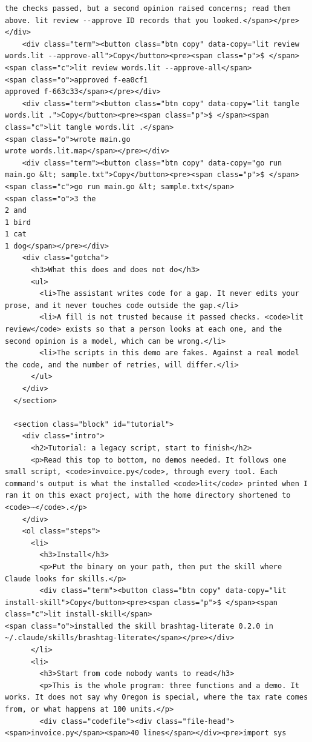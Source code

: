 \documentclass[10pt,a4paper]{article}
\begin{document}
\begin{Verbatim}
the checks passed, but a second opinion raised concerns; read them above. lit review --approve ID records that you looked.</span></pre></div>
    <div class="term"><button class="btn copy" data-copy="lit review words.lit --approve-all">Copy</button><pre><span class="p">$ </span><span class="c">lit review words.lit --approve-all</span>
<span class="o">approved f-ea0cf1
approved f-663c33</span></pre></div>
    <div class="term"><button class="btn copy" data-copy="lit tangle words.lit .">Copy</button><pre><span class="p">$ </span><span class="c">lit tangle words.lit .</span>
<span class="o">wrote main.go
wrote words.lit.map</span></pre></div>
    <div class="term"><button class="btn copy" data-copy="go run main.go &lt; sample.txt">Copy</button><pre><span class="p">$ </span><span class="c">go run main.go &lt; sample.txt</span>
<span class="o">3 the
2 and
1 bird
1 cat
1 dog</span></pre></div>
    <div class="gotcha">
      <h3>What this does and does not do</h3>
      <ul>
        <li>The assistant writes code for a gap. It never edits your prose, and it never touches code outside the gap.</li>
        <li>A fill is not trusted because it passed checks. <code>lit review</code> exists so that a person looks at each one, and the second opinion is a model, which can be wrong.</li>
        <li>The scripts in this demo are fakes. Against a real model the code, and the number of retries, will differ.</li>
      </ul>
    </div>
  </section>

  <section class="block" id="tutorial">
    <div class="intro">
      <h2>Tutorial: a legacy script, start to finish</h2>
      <p>Read this top to bottom, no demos needed. It follows one small script, <code>invoice.py</code>, through every tool. Each command's output is what the installed <code>lit</code> printed when I ran it on this exact project, with the home directory shortened to <code>~</code>.</p>
    </div>
    <ol class="steps">
      <li>
        <h3>Install</h3>
        <p>Put the binary on your path, then put the skill where Claude looks for skills.</p>
        <div class="term"><button class="btn copy" data-copy="lit install-skill">Copy</button><pre><span class="p">$ </span><span class="c">lit install-skill</span>
<span class="o">installed the skill brashtag-literate 0.2.0 in ~/.claude/skills/brashtag-literate</span></pre></div>
      </li>
      <li>
        <h3>Start from code nobody wants to read</h3>
        <p>This is the whole program: three functions and a demo. It works. It does not say why Oregon is special, where the tax rate comes from, or what happens at 100 units.</p>
        <div class="codefile"><div class="file-head"><span>invoice.py</span><span>40 lines</span></div><pre>import sys


\end{Verbatim}
\end{document}
